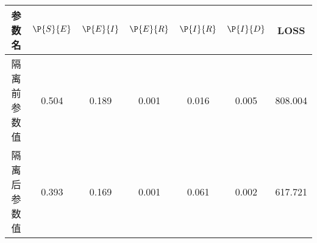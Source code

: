 \begin{tabular}{ccccccc}
\hline
参数名&$\P{S}{E}$&$\P{E}{I}$&$\P{E}{R}$&$\P{I}{R}$&$\P{I}{D}$&LOSS\\
\hline
隔离前参数值&0.504&0.189&0.001&0.016&0.005&808.004\\
隔离后参数值&0.393&0.169&0.001&0.061&0.002&617.721\\
\hline
\end{tabular}